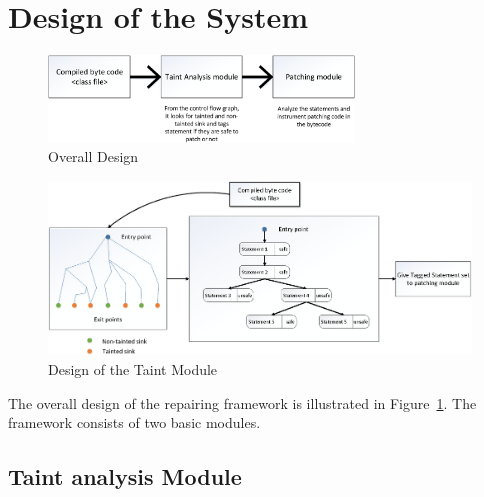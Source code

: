 \section{Design of the System}
\label{sec:SystemDesign}


\begin{figure}[!htb]
\centering
\includegraphics[width=3.2in]{images/OverallDesign.png}
\caption{Overall Design}
\label{fig:overallDesign}
\end{figure}


% 

\begin{figure}
\centering
  \includegraphics[width= 7.0in]{images/TaintModule.png}
  \caption{Design of the Taint Module}
  \label{fig:TaintModule}
\end{figure}


The overall design of the repairing framework is illustrated in
Figure~\ref{fig:overallDesign}. The framework consists of two basic modules.


\subsection{Taint analysis Module}
\label{subsec:TaintModule}

